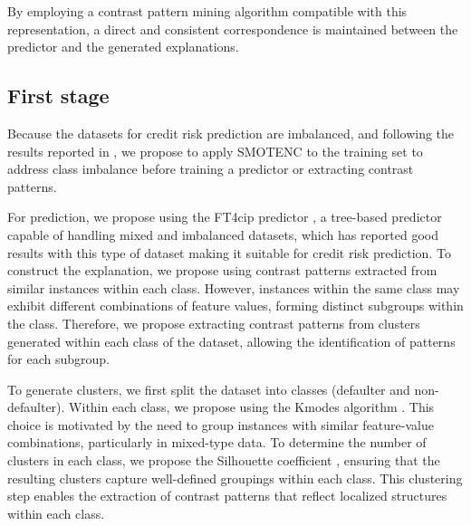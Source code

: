 {		    	By employing a contrast pattern mining algorithm compatible with this representation, a direct and consistent correspondence is maintained between the predictor and the generated explanations. %

		\subsection{First stage}
       	Because the datasets for credit risk prediction are imbalanced, and following the results reported in \cite{melchor2025oversampling}, we propose to apply SMOTENC \cite{chawla2002smote, mukherjee2021smote} to the training set to address class imbalance before training a predictor or extracting contrast patterns.\newline
       
       	For prediction, we propose using the FT4cip predictor \cite{canete2022ft4cip}, a tree-based predictor capable of handling mixed and imbalanced datasets, which has reported good results with this type of dataset making it suitable for credit risk prediction. To construct the explanation, we propose using contrast patterns extracted from similar instances within each class. However, instances within the same class may exhibit different combinations of feature values, forming distinct subgroups within the class. Therefore, we propose extracting contrast patterns from clusters generated within each class of the dataset, allowing the identification of patterns for each subgroup.\newline
       	
       To generate clusters, we first split the dataset into classes (defaulter and non-defaulter). Within each class, we propose using the Kmodes algorithm \cite{huang1997clustering, huang1998extensions}. This choice is motivated by the need to group instances with similar feature-value combinations, particularly in mixed-type data. To determine the number of clusters in each class, we propose the Silhouette coefficient \cite{dinh2019estimating, kuswardana2025comparison}, ensuring that the resulting clusters capture well-defined groupings within each class. This clustering step enables the extraction of contrast patterns that reflect localized structures within each class. \newline
       
}
